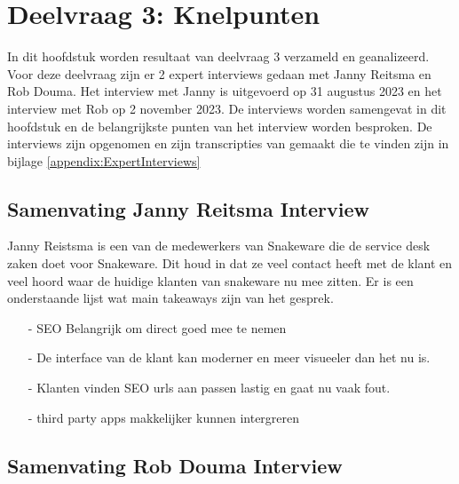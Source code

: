 \section{Deelvraag 3: Knelpunten}
In dit hoofdstuk worden resultaat van deelvraag 3 \textit{\SubquestionThree} verzameld en geanalizeerd.
Voor deze deelvraag zijn er 2 expert interviews gedaan met Janny Reitsma en Rob Douma.
Het interview met Janny is uitgevoerd op 31 augustus 2023 en het interview met Rob op 2 november 2023.
De interviews worden samengevat in dit hoofdstuk en de belangrijkste punten van het interview worden besproken.
De interviews zijn opgenomen en zijn transcripties van gemaakt die te vinden zijn in bijlage \ref{appendix:ExpertInterviews}

\subsection{Samenvating Janny Reitsma Interview}
Janny Reistsma is een van de medewerkers van Snakeware die de service desk zaken doet voor Snakeware.
Dit houd in dat ze veel contact heeft met de klant en veel hoord waar de huidige klanten van snakeware nu mee zitten.
Er is een onderstaande lijst wat main takeaways zijn van het gesprek.
\begin{itemize}
    \item[-] SEO Belangrijk om direct goed mee te nemen
    \item[-] De interface van de klant kan moderner en meer visueeler dan het nu is.
    \item[-] Klanten vinden SEO urls aan passen lastig en gaat nu vaak fout.
    \item[-] third party apps makkelijker kunnen intergreren
\end{itemize}

\subsection{Samenvating Rob Douma Interview}
